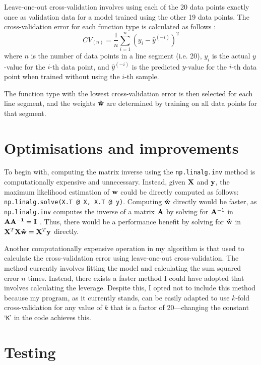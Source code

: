 \documentclass[onecolumn, 12pt, a4paper]{article}
\begin{document}
Leave-one-out cross-validation involves using each of
the 20 data points exactly once as validation data for a model
trained using the other 19 data points. 
The cross-validation error for each function type is calculated
as follows \cite{Stanford}:
\[
    CV_{(n)} = \frac{1}{n} \sum_{i = 1}^{n} (y_{i} - \hat{y}^{(-i)})^{2}
\]
where
$n$ is the number of data points in a line segment (i.e. 20),
$y_{i}$ is the actual $y$-value for the $i$-th data point,
and $\hat{y}^{(-i)}$ is the predicted $y$-value for the $i$-th
data point when trained without using the $i$-th sample.

The function type with the lowest cross-validation error
is then selected for each line segment,
and the weights $\vb{\hat{w}}$ are determined by training on all
data points for that segment.

\section{Optimisations and improvements}

To begin with,
computing the matrix inverse using the \texttt{np.linalg.inv}
method is computationally expensive and unnecessary.
Instead, given $\vb{X}$ and $\vb{y}$, the maximum likelihood
estimation of $\vb{w}$ could be directly computed as follows:
\texttt{np.linalg.solve(X.T @ X, X.T @ y)}.
Computing $\vb{\hat{w}}$ directly would be faster, as \texttt{np.linalg.inv}
computes the inverse of a matrix $\vb{A}$ by solving for $\vb{A}^{-1}$
in $\vb{AA^{-1} = I}$ \cite{StackOverflow}.
Thus, there would be a performance benefit by solving for
$\vb{\hat{w}}$ in
$\vb{X}^{T} \vb{X} \vb{\hat{w}} = \vb{X}^{T} \vb{y}$ directly.

Another computationally expensive operation in my
algorithm is that used to calculate the cross-validation error 
using leave-one-out cross-validation.
The method currently involves
fitting the model and calculating the sum squared error
$n$ times. 
Instead, there exists a faster method I could have
adopted that involves calculating the leverage.
Despite this, I opted not to include this method 
because my program, as it currently stands, can be 
easily adapted to use $k$-fold cross-validation for 
any value of $k$ that is a factor of 20---changing
the constant `\texttt{K}' in the code achieves this.

\section{Testing}
\end{document}
